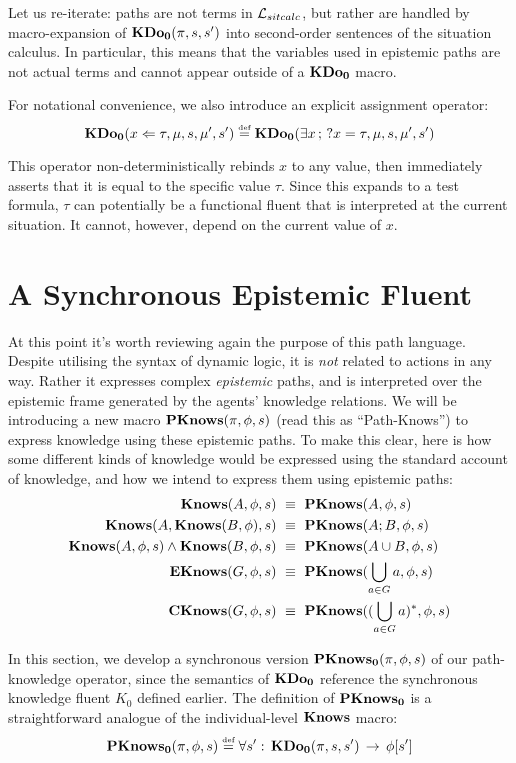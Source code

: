 Let us re-iterate: paths are not terms in $\mathcal{L}_{sitcalc}$, but rather are
handled by macro-expansion of $\mathbf{KDo_{0}}(\pi,s,s')$ into second-order
sentences of the situation calculus. In particular, this means that
the variables used in epistemic paths are not actual terms and cannot
appear outside of a $\mathbf{KDo_{0}}$ macro.

For notational convenience, we also introduce an explicit assignment
operator:\[
\mathbf{KDo_{0}}(x\Leftarrow\tau,\mu,s,\mu',s')\stackrel{\mbox{\tiny def}}{=}\mathbf{KDo_{0}}(\exists x\,;\,?x=\tau,\mu,s,\mu',s')\]


This operator non-deterministically rebinds $x$ to any value, then
immediately asserts that it is equal to the specific value $\tau$.
Since this expands to a test formula, $\tau$ can potentially be a
functional fluent that is interpreted at the current situation. It
cannot, however, depend on the current value of $x$.


\section{A Synchronous Epistemic Fluent\label{sec:CKnowledge:Synchronous}}

At this point it's worth reviewing again the purpose of this path
language. Despite utilising the syntax of dynamic logic, it is \emph{not}
related to actions in any way. Rather it expresses complex \emph{epistemic}
paths, and is interpreted over the epistemic frame generated by the
agents' knowledge relations. We will be introducing a new macro $\mathbf{PKnows}(\pi,\phi,s)$
(read this as {}``Path-Knows'') to express knowledge using these
epistemic paths. To make this clear, here is how some different kinds
of knowledge would be expressed using the standard account of knowledge,
and how we intend to express them using epistemic paths:\begin{align}
\mathbf{Knows}(A,\phi,s) & \,\,\equiv\,\,\mathbf{PKnows}(A,\phi,s)\nonumber \\
\mathbf{Knows}(A,\mathbf{Knows}(B,\phi),s) & \,\,\equiv\,\,\mathbf{PKnows}(A;B,\phi,s)\nonumber \\
\mathbf{Knows}(A,\phi,s)\wedge\mathbf{Knows}(B,\phi,s) & \,\,\equiv\,\,\mathbf{PKnows}(A\cup B,\phi,s)\nonumber \\
\mathbf{EKnows}(G,\phi,s) & \,\,\equiv\,\,\mathbf{PKnows}(\bigcup_{a\in G}a,\phi,s)\nonumber \\
\mathbf{CKnows}(G,\phi,s) & \,\,\equiv\,\,\mathbf{PKnows}((\bigcup_{a\in G}a)^{*},\phi,s)\label{eq:pknows_identities}\end{align}


In this section, we develop a synchronous version $\mathbf{PKnows_{0}}(\pi,\phi,s)$
of our path-knowledge operator, since the semantics of $\mathbf{KDo_{0}}$ reference
the synchronous knowledge fluent $K_{0}$ defined earlier. The definition
of $\mathbf{PKnows_{0}}$ is a straightforward analogue of the individual-level
$\mathbf{Knows}$ macro:\[
\mathbf{PKnows_{0}}(\pi,\phi,s)\stackrel{\mbox{\tiny def}}{=}\forall s':\,\mathbf{KDo_{0}}(\pi,s,s')\,\rightarrow\,\phi[s']\]


